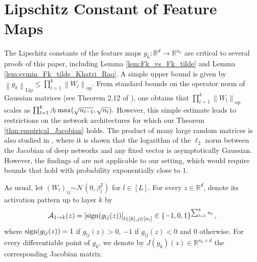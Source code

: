 \documentclass[11pt]{article}
\def\RR{\mathbb{R}}
\def\Set#1{\left\{ #1 \right\}}
\newcommand{\distas}[1]{\mathbin{\overset{#1}{\sim}}}
\newcommand{\bigO}[1]{\mathcal{O}\left(#1\right)}
\newcommand{\norm}[1]{\left\|#1\right\|}
\def\GaussOpNorm{Theorem 2.12 of \cite{Davidson2001}}
\def\Lip{\mathrm{Lip}}
\def\op{\mathrm{op}}
\def\sign{\mathop{\rm sign}\limits}
\def\max{\mathop{\rm max}\nolimits}
\begin{document}
\section{Lipschitz Constant of Feature Maps}\label{sec:lip_const_fk}
The Lipschitz constants of the feature maps $g_k:\RR^d\to\RR^{n_k}$ are critical to several proofs of this paper,
including Lemma \ref{lem:Fk_vs_Fk_tilde} and Lemma \ref{lem:svmin_Fk_tilde_Khatri_Rao}.
A simple upper bound is given by
    $\norm{g_k}_{\Lip}
    \leq\prod_{l=1}^{k} \norm{W_l}_{\op}$. 
    From standard bounds on the operator norm of Gaussian matrices (see \GaussOpNorm),
    one obtains that 
$\prod_{l=1}^{k} \norm{W_l}_{\op}$
 scales as $\prod_{l=1}^{k}\beta_l\max(\sqrt{n_{l-1}},\sqrt{n_l}).$
However, this simple estimate leads to restrictions on the network architectures 
for which our Theorem \ref{thm:empirical_Jacobian} holds. 
The product of many large random matrices is also studied in \citep{hanin2019products}, where it is shown that the logarithm of the $\ell_2$ norm between the Jacobian of deep networks and any fixed vector is asymptotically Gaussian. However, the findings of \citep{hanin2019products} are not applicable to our setting, which would require bounds that hold with probability exponentially close to $1$. 


 


As usual, let $(W_l)_{ij}\distas{}\mathcal{N}(0,\beta_l^2)$ for $l\in[L].$
For every $z\in\RR^d$, denote its activation pattern up to layer $k$ by
$$\mathcal{A}_{1\to k}(z)=\left[\sign(g_{lj}(z))\right]_{l\in[k],j\in[n_l]}\in\Set{-1,0,1}^{\sum_{l=1}^{k}n_l},$$
where $\sign(g_{lj}(z))=1$ if $g_{lj}(z)>0$, $-1$ if $g_{lj}(z)<0$ and $0$ otherwise.
For every differentiable point of $g_k$, we denote by $J(g_k)(z)\in\RR^{n_k\times d}$ the corresponding Jacobian matrix.
\end{document}
